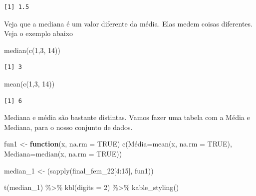 \documentclass[
  letterpaper,
  DIV=11,
  numbers=noendperiod]{scrreprt}
\newenvironment{Shaded}{\begin{snugshade}}{\end{snugshade}}
\newcommand{\AttributeTok}[1]{\textcolor[rgb]{0.40,0.45,0.13}{#1}}
\newcommand{\ConstantTok}[1]{\textcolor[rgb]{0.56,0.35,0.01}{#1}}
\newcommand{\ControlFlowTok}[1]{\textcolor[rgb]{0.00,0.23,0.31}{\textbf{#1}}}
\newcommand{\DecValTok}[1]{\textcolor[rgb]{0.68,0.00,0.00}{#1}}
\newcommand{\FunctionTok}[1]{\textcolor[rgb]{0.28,0.35,0.67}{#1}}
\newcommand{\NormalTok}[1]{\textcolor[rgb]{0.00,0.23,0.31}{#1}}
\newcommand{\OtherTok}[1]{\textcolor[rgb]{0.00,0.23,0.31}{#1}}
\newcommand{\SpecialCharTok}[1]{\textcolor[rgb]{0.37,0.37,0.37}{#1}}
\begin{document}
\begin{verbatim}
[1] 1.5
\end{verbatim}

Veja que a mediana é um valor diferente da média. Elas medem coisas
diferentes. Veja o exemplo abaixo

\begin{Shaded}
\begin{Highlighting}[]
\FunctionTok{median}\NormalTok{(}\FunctionTok{c}\NormalTok{(}\DecValTok{1}\NormalTok{,}\DecValTok{3}\NormalTok{, }\DecValTok{14}\NormalTok{))}
\end{Highlighting}
\end{Shaded}

\begin{verbatim}
[1] 3
\end{verbatim}

\begin{Shaded}
\begin{Highlighting}[]
\FunctionTok{mean}\NormalTok{(}\FunctionTok{c}\NormalTok{(}\DecValTok{1}\NormalTok{,}\DecValTok{3}\NormalTok{, }\DecValTok{14}\NormalTok{))}
\end{Highlighting}
\end{Shaded}

\begin{verbatim}
[1] 6
\end{verbatim}

Mediana e média são bastante distintas. Vamos fazer uma tabela com a
Média e Mediana, para o nosso conjunto de dados.

\begin{Shaded}
\begin{Highlighting}[]
\NormalTok{fun1 }\OtherTok{\textless{}{-}} \ControlFlowTok{function}\NormalTok{(x, }\AttributeTok{na.rm =} \ConstantTok{TRUE}\NormalTok{) }\FunctionTok{c}\NormalTok{(Média}\OtherTok{=}\FunctionTok{mean}\NormalTok{(x, }\AttributeTok{na.rm =} \ConstantTok{TRUE}\NormalTok{), }\AttributeTok{Mediana=}\FunctionTok{median}\NormalTok{(x, }\AttributeTok{na.rm =} \ConstantTok{TRUE}\NormalTok{))}

\NormalTok{median\_1 }\OtherTok{\textless{}{-}}\NormalTok{ (}\FunctionTok{sapply}\NormalTok{(final\_fem\_22[}\DecValTok{4}\SpecialCharTok{:}\DecValTok{15}\NormalTok{], fun1))}

\FunctionTok{t}\NormalTok{(median\_1) }\SpecialCharTok{\%\textgreater{}\%} 
  \FunctionTok{kbl}\NormalTok{(}\AttributeTok{digits =} \DecValTok{2}\NormalTok{) }\SpecialCharTok{\%\textgreater{}\%}
     \FunctionTok{kable\_styling}\NormalTok{()}
\end{Highlighting}
\end{Shaded}
\end{document}
